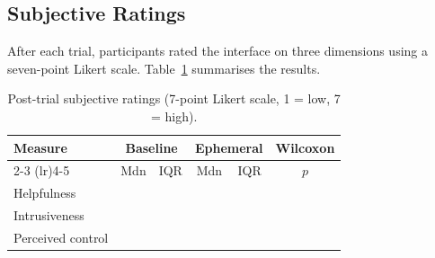 \subsection{Subjective Ratings}

%

After each trial, participants rated the interface on three dimensions using a seven-point Likert scale. Table~\ref{tab:likert} summarises the results.

\begin{table}[htbp]
    \centering
    \caption{Post-trial subjective ratings (7-point Likert scale, 1 = low, 7 = high).}
    \label{tab:likert}
    \begin{tabular}{@{}lccccc@{}}
        \toprule
        Measure & \multicolumn{2}{c}{Baseline} & \multicolumn{2}{c}{Ephemeral} & Wilcoxon \\
        \cmidrule(lr){2-3} \cmidrule(lr){4-5}
        & Mdn & IQR & Mdn & IQR & $p$ \\
        \midrule
        Helpfulness & \GenLikertHelpfulnessBaselineMdn{} & \GenLikertHelpfulnessBaselineIqr{} & \GenLikertHelpfulnessEphemeralMdn{} & \GenLikertHelpfulnessEphemeralIqr{} & \GenLikertHelpfulnessP{} \\
        Intrusiveness & \GenLikertIntrusivenessBaselineMdn{} & \GenLikertIntrusivenessBaselineIqr{} & \GenLikertIntrusivenessEphemeralMdn{} & \GenLikertIntrusivenessEphemeralIqr{} & \GenLikertIntrusivenessP{} \\
        Perceived control & \GenLikertControlBaselineMdn{} & \GenLikertControlBaselineIqr{} & \GenLikertControlEphemeralMdn{} & \GenLikertControlEphemeralIqr{} & \GenLikertControlP{} \\
        \bottomrule
    \end{tabular}
\end{table}

